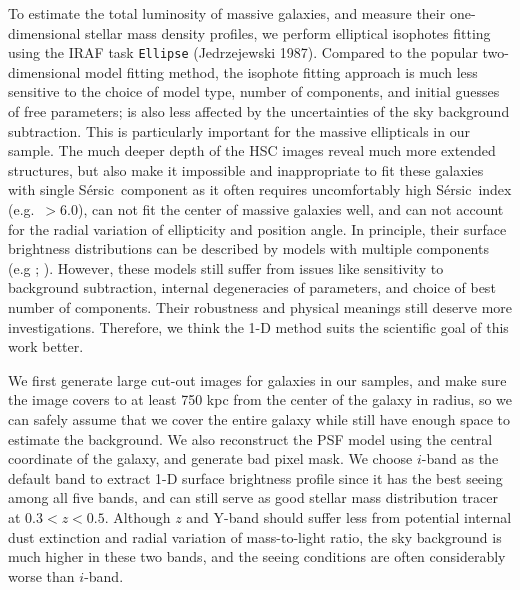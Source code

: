 \documentclass[preprint]{aastex}
\def\ser{{S\'{e}rsic\ }}
\begin{document}
\begin{CJK*}{UTF8}{gbsn}
    To estimate the total luminosity of massive galaxies, and measure their 
    one-dimensional stellar mass density profiles, we perform elliptical isophotes 
    fitting using the IRAF task \texttt{Ellipse} (Jedrzejewski 1987).  
    Compared to the popular two-dimensional model fitting method, the isophote fitting
    approach is much less sensitive to the choice of model type, number of components, 
    and initial guesses of free parameters; is also less affected by the uncertainties 
    of the sky background subtraction.  
    This is particularly important for the massive ellipticals in our sample.  
    The much deeper depth of the HSC images reveal much more extended structures, 
    but also make it impossible and inappropriate to fit these galaxies with single 
    \ser component as it often requires uncomfortably high \ser index (e.g.\ $>6.0$), 
    can not fit the center of massive galaxies well, and can not account for the 
    radial variation of ellipticity and position angle. 
    In principle, their surface brightness distributions can be described by models 
    with multiple components (e.g \citealt{Huang2013a}; \citealt{Huang2013b}).  
    However, these models still suffer from issues like sensitivity to background 
    subtraction, internal degeneracies of parameters, and choice of best number of 
    components.  
    Their robustness and physical meanings still deserve more investigations. 
    Therefore, we think the 1-D method suits the scientific goal of this work better.
    
    We first generate large cut-out images for galaxies in our samples, and make sure
    the image covers to at least 750 kpc from the center of the galaxy in radius, so 
    we can safely assume that we cover the entire galaxy while still have enough space 
    to estimate the background.  
    We also reconstruct the PSF model using the central coordinate of the galaxy, and 
    generate bad pixel mask. 
    We choose $i$-band as the default band to extract 1-D surface brightness profile 
    since it has the best seeing among all five bands, and can still serve as good 
    stellar mass distribution tracer at $0.3 < z < 0.5$.  
    Although $z$ and Y-band should suffer less from potential internal dust extinction
    and radial variation of mass-to-light ratio, the sky background is much higher in 
    these two bands, and the seeing conditions are often considerably worse than 
    $i$-band.  
    

\end{CJK*}
\end{document}
